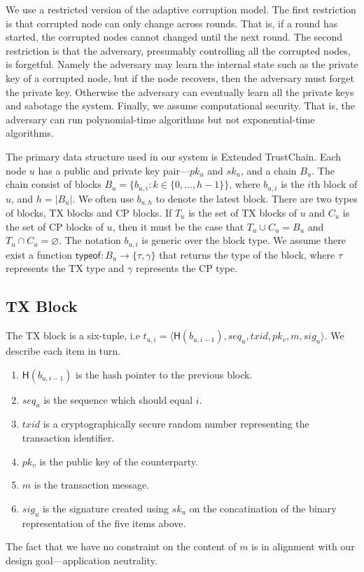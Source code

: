 We use a restricted version of the adaptive corruption model.
The first restriction is that corrupted node can only change across rounds.
That is, if a round has started, the corrupted nodes cannot changed until the next round.
The second restriction is that the adversary, presumably controlling all the corrupted nodes, is forgetful.
Namely the adversary may learn the internal state such as the private key of a corrupted node,
but if the node recovers, then the adversary must forget the private key.
Otherwise the adversary can eventually learn all the private keys and sabotage the system.
Finally, we assume computational security.
That is, the adversary can run polynomial-time algorithms but not exponential-time algorithms.

The primary data structure used in our system is Extended TrustChain.
Each node $u$ has a public and private key pair---$pk_u$ and $sk_u$, and a chain $B_u$.
The chain consist of blocks $B_u = \{ b_{u, i} : k \in \{ 0, \dots, h - 1 \} \}$,
where $b_{u, i}$ is the $i$th block of $u$,
and $h = |B_u|$.
We often use $b_{u, h}$ to denote the latest block.
There are two types of blocks, TX blocks and CP blocks.
If $T_u$ is the set of TX blocks of $u$ and $C_u$ is the set of CP blocks of $u$,
then it must be the case that $T_u \cup C_u = B_u$ and $T_u \cap C_u = \varnothing$.
The notation $b_{u, i}$ is generic over the block type.
We assume there exist a function $\textsf{typeof}: B_u \rightarrow \{ \tau, \gamma \}$ that returns the type of the block,
where $\tau$ represents the TX type and $\gamma$ represents the CP type.

\subsection{TX Block}
The TX block is a six-tuple, i.e $t_{u, i} = \langle \textsf{H}(b_{u, i - 1}), seq_u, txid, pk_v, m, sig_u \rangle$.
We describe each item in turn.
\begin{enumerate}
\item $\textsf{H}(b_{u, i - 1})$ is the hash pointer to the previous block.
\item $seq_u$ is the sequence which should equal $i$.
\item $txid$ is a cryptographically secure random number representing the transaction identifier.
\item $pk_v$ is the public key of the counterparty.
\item $m$ is the transaction message.
\item $sig_u$ is the signature created using $sk_u$ on the concatination of the binary representation of the five items above.
\end{enumerate}
The fact that we have no constraint on the content of $m$ is in alignment with our design goal---application neutrality.

